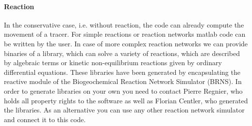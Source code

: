 \documentclass[12pt]{report}
\newcommand*{\BibPath}{bibtex}
\begin{document}
\paragraph*{Reaction}

In the conservative case, i.e. without reaction, the code can already compute the movement of a tracer. For simple reactions or reaction networks matlab code can be written by the user. In case of more complex reaction networks we can provide binaries of a library, which can solve a variety of reactions, which are described by algebraic terms or kinetic non-equilibrium reactions given by ordinary differential equations. These libraries have been generated by encapsulating the reactive module of the Biogeochemical Reaction Network Simulator (BRNS). In order to generate libraries on your own you need to contact Pierre Regnier, who holds all property rights to the software as well as Florian Centler, who generated the libraries. As an alternative you can use any other reaction network simulator and connect it to this code.


\newpage


\end{document}
